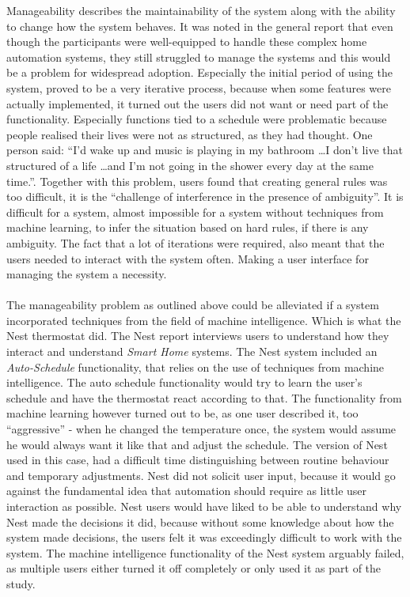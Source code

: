 Manageability describes the maintainability of the system along with the ability
to change how the system behaves. It was noted in the general report that even though the participants were well-equipped to handle these complex home automation systems, they still struggled to manage the systems and this would be a problem for widespread adoption. Especially the initial period of using the system, proved to be a very iterative process, because when some features were actually implemented, it turned out the users did not want or need part of the functionality. Especially functions tied to a schedule were problematic because people realised their lives were not as structured, as they had thought. One person said: \enquote{I'd wake up and music is playing in my bathroom \ldots I don't live that structured of a life \ldots and I'm not going in the shower every day at the same time.}. Together with this problem, users found that creating general rules was too difficult, it is the \enquote{challenge of interference in the presence of ambiguity}\cite{HAInterviews}. It is difficult for a system, almost impossible for a system without techniques from machine learning, to infer the situation based on hard rules, if there is any ambiguity. The fact that a lot of iterations were required, also meant that the users needed to interact with the system often. Making a user interface for managing the system a necessity.
\\\\
The manageability problem as outlined above could be alleviated if a system incorporated techniques from the field of machine intelligence. Which is what the Nest thermostat did. The Nest report interviews users to understand how they interact and understand \emph{Smart Home} systems. The Nest system included an \emph{Auto-Schedule} functionality, that relies on the use of techniques from machine intelligence. The auto schedule functionality would try to learn the user's schedule and have the thermostat react according to that. The functionality from machine learning however turned out to be, as one user described it, too \enquote{aggressive}\cite{AdaptiveInterviews} - when he changed the temperature once, the system would assume he would always want it like that and adjust the schedule. The version of Nest used in this case, had a difficult time distinguishing between routine behaviour and temporary adjustments. Nest did not solicit user input, because it would go against the fundamental idea that automation should require as little user interaction as possible. Nest users would have liked to be able to understand why Nest made the decisions it did, because without some knowledge about how the system made decisions, the users felt it was exceedingly difficult to work with the system. The machine intelligence functionality of the Nest system arguably failed, as multiple users either turned it off completely or only used it as part of the study.

